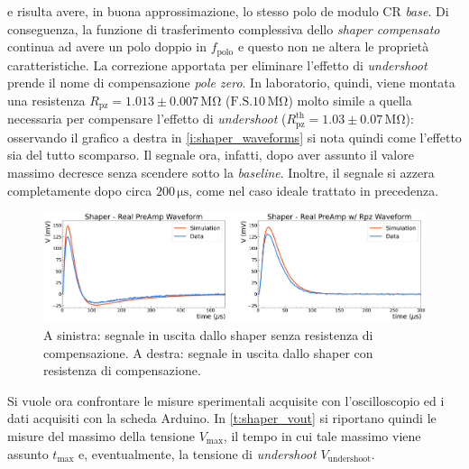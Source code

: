 \documentclass[a4paper,11pt]{article} %
\begin{document}
e risulta avere, in buona approssimazione, lo stesso polo de modulo CR \textit{base}. Di conseguenza, la funzione di
trasferimento complessiva dello \textit{shaper compensato} continua ad avere un polo doppio in $f_{\text{polo}}$ e
questo non ne altera le proprietà caratteristiche. La correzione apportata per eliminare l'effetto di
\textit{undershoot} prende il nome di compensazione \textit{pole zero}. In laboratorio, quindi, viene montata una
resistenza $R_{\text{pz}} = 1.013 \pm 0.007 \, \si{\mega\ohm}$ ($\text{F.S.} 10\,\si{\mega\ohm}$) molto simile a quella
necessaria per compensare l'effetto di \textit{undershoot} ($R_{\text{pz}}^{\text{th}} = 1.03 \pm 0.07 \,
\si{\mega\ohm}$): osservando il grafico a destra in \autoref{i:shaper_waveforms} si nota quindi come l'effetto sia del
tutto scomparso. Il segnale ora, infatti, dopo aver assunto il valore massimo decresce senza scendere sotto la
\textit{baseline}. Inoltre, il segnale si azzera completamente dopo circa $200\,\si{\us}$, come nel caso ideale trattato
in precedenza. 

\begin{figure}[H] 
	\centering
	\includegraphics[width=\linewidth]{../Plots/Shaper/shaper_preamp_waveforms.png} 
	\vspace{-20pt}
	\caption{\small A sinistra: segnale in uscita dallo shaper senza resistenza di compensazione. 
				A destra: segnale in uscita dallo shaper con resistenza di compensazione.} 
	\label{i:shaper_waveforms} 
\end{figure} 
\vspace{-7pt}
Si vuole ora confrontare le misure sperimentali acquisite con l'oscilloscopio ed i dati acquisiti con la scheda
Arduino. In \autoref{t:shaper_vout} si riportano quindi le misure del massimo della tensione $V_{\text{max}}$, il tempo
in cui tale massimo viene assunto $t_{\text{max}}$ e, eventualmente, la tensione di \textit{undershoot}
$V_{\text{undershoot}}$. 
\end{document}
